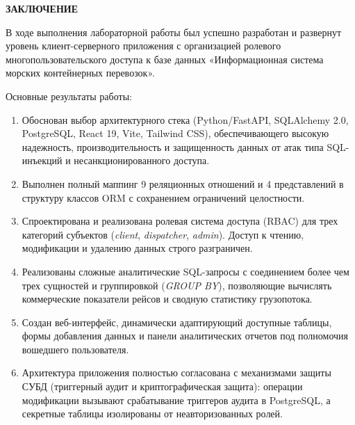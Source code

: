 \documentclass[a4paper,14pt]{article}
\begin{document}
\newpage
\begin{center}
    {\bfseries \MakeUppercase{Заключение}}
\end{center}

В ходе выполнения лабораторной работы был успешно разработан и развернут уровень клиент-серверного приложения с организацией ролевого многопользовательского доступа к базе данных «Информационная система морских контейнерных перевозок».

Основные результаты работы:
\begin{enumerate}
    \item Обоснован выбор архитектурного стека (Python/FastAPI, SQLAlchemy 2.0, PostgreSQL, React 19, Vite, Tailwind CSS), обеспечивающего высокую надежность, производительность и защищенность данных от атак типа SQL-инъекций и несанкционированного доступа.
    \item Выполнен полный маппинг 9 реляционных отношений и 4 представлений в структуру классов ORM с сохранением ограничений целостности.
    \item Спроектирована и реализована ролевая система доступа (RBAC) для трех категорий субъектов (\textit{client}, \textit{dispatcher}, \textit{admin}). Доступ к чтению, модификации и удалению данных строго разграничен.
    \item Реализованы сложные аналитические SQL-запросы с соединением более чем трех сущностей и группировкой (\textit{GROUP BY}), позволяющие вычислять коммерческие показатели рейсов и сводную статистику грузопотока.
    \item Создан веб-интерфейс, динамически адаптирующий доступные таблицы, формы добавления данных и панели аналитических отчетов под полномочия вошедшего пользователя.
    \item Архитектура приложения полностью согласована с механизмами защиты СУБД (триггерный аудит и криптографическая защита): операции модификации вызывают срабатывание триггеров аудита в PostgreSQL, а секретные таблицы изолированы от неавторизованных ролей.
\end{enumerate}
\end{document}
